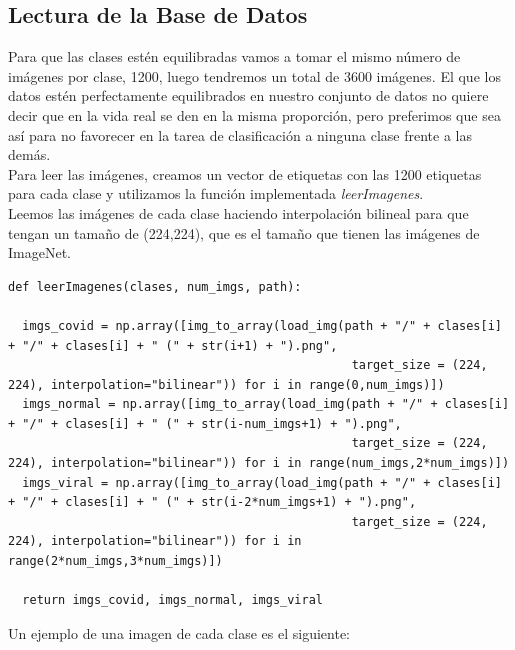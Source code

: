 \documentclass[11pt,a4paper]{article}
\theoremstyle{definition}
\begin{document}
\subsection{Lectura de la Base de Datos}

Para que las clases estén equilibradas vamos a tomar el mismo número de imágenes por clase, 1200, luego tendremos un total de 3600 imágenes.  El que los datos estén perfectamente equilibrados en nuestro conjunto de datos no quiere decir que en la vida real se den en la misma proporción,  pero preferimos que sea así para no favorecer en la tarea de clasificación a ninguna clase frente a las demás.\\

Para leer las imágenes, creamos un vector de etiquetas con las 1200 etiquetas para cada clase y utilizamos la función implementada \textit{leerImagenes}.\\

Leemos las imágenes de cada clase haciendo interpolación bilineal para que tengan un tamaño de (224,224), que es el tamaño que tienen las imágenes de ImageNet.\\
\begin{lstlisting}
def leerImagenes(clases, num_imgs, path):

  imgs_covid = np.array([img_to_array(load_img(path + "/" + clases[i] + "/" + clases[i] + " (" + str(i+1) + ").png",
                                                target_size = (224, 224), interpolation="bilinear")) for i in range(0,num_imgs)])
  imgs_normal = np.array([img_to_array(load_img(path + "/" + clases[i] + "/" + clases[i] + " (" + str(i-num_imgs+1) + ").png",
                                                target_size = (224, 224), interpolation="bilinear")) for i in range(num_imgs,2*num_imgs)])
  imgs_viral = np.array([img_to_array(load_img(path + "/" + clases[i] + "/" + clases[i] + " (" + str(i-2*num_imgs+1) + ").png",
                                                target_size = (224, 224), interpolation="bilinear")) for i in range(2*num_imgs,3*num_imgs)])

  return imgs_covid, imgs_normal, imgs_viral
\end{lstlisting}

Un ejemplo de una imagen de cada clase es el siguiente:
\end{document}
